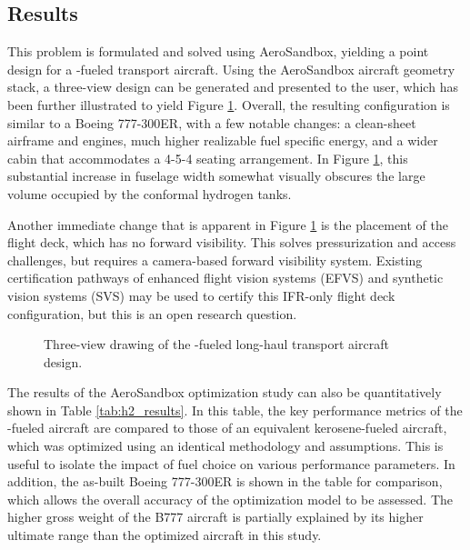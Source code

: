 \subsection{Results}

This problem is formulated and solved using AeroSandbox, yielding a point design for a \lh-fueled transport aircraft. Using the AeroSandbox aircraft geometry stack, a three-view design can be generated and presented to the user, which has been further illustrated to yield Figure \ref{fig:h2_three_view}. Overall, the resulting configuration is similar to a Boeing 777-300ER, with a few notable changes: a clean-sheet airframe and engines, much higher realizable fuel specific energy, and a wider cabin that accommodates a 4-5-4 seating arrangement. In Figure \ref{fig:h2_three_view}, this substantial increase in fuselage width somewhat visually obscures the large volume occupied by the conformal hydrogen tanks.

Another immediate change that is apparent in Figure \ref{fig:h2_three_view} is the placement of the flight deck, which has no forward visibility. This solves pressurization and access challenges, but requires a camera-based forward visibility system. Existing certification pathways of enhanced flight vision systems (EFVS) and synthetic vision systems (SVS) may be used to certify this IFR-only flight deck configuration, but this is an open research question.

\begin{figure}[h]
    \centering
    
    \caption{Three-view drawing of the \lh-fueled long-haul transport aircraft design.}
    \label{fig:h2_three_view}
\end{figure}

The results of the AeroSandbox optimization study can also be quantitatively shown in Table \ref{tab:h2_results}. In this table, the key performance metrics of the \lh-fueled aircraft are compared to those of an equivalent kerosene-fueled aircraft, which was optimized using an identical methodology and assumptions. This is useful to isolate the impact of fuel choice on various performance parameters. In addition, the as-built Boeing 777-300ER is shown in the table for comparison, which allows the overall accuracy of the optimization model to be assessed. The higher gross weight of the B777 aircraft is partially explained by its higher ultimate range than the optimized aircraft in this study.

